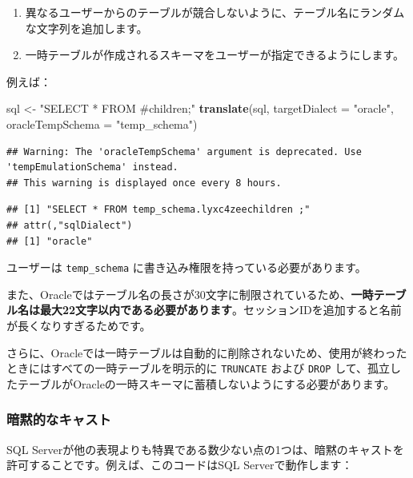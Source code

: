 \documentclass[
  11pt]{book}
\newenvironment{Shaded}{\begin{snugshade}}{\end{snugshade}}
\newcommand{\AttributeTok}[1]{\textcolor[rgb]{0.13,0.29,0.53}{#1}}
\newcommand{\FunctionTok}[1]{\textcolor[rgb]{0.13,0.29,0.53}{\textbf{#1}}}
\newcommand{\NormalTok}[1]{#1}
\newcommand{\OtherTok}[1]{\textcolor[rgb]{0.56,0.35,0.01}{#1}}
\newcommand{\StringTok}[1]{\textcolor[rgb]{0.31,0.60,0.02}{#1}}
\providecommand{\tightlist}{%
  \setlength{\itemsep}{0pt}\setlength{\parskip}{0pt}}
\theoremstyle{definition}
\theoremstyle{definition}
\theoremstyle{definition}
\theoremstyle{definition}
\theoremstyle{remark}
\begin{document}
\begin{enumerate}
\def\labelenumi{\arabic{enumi}.}
\tightlist
\item
  異なるユーザーからのテーブルが競合しないように、テーブル名にランダムな文字列を追加します。
\item
  一時テーブルが作成されるスキーマをユーザーが指定できるようにします。
\end{enumerate}

例えば：

\begin{Shaded}
\begin{Highlighting}[]
\NormalTok{sql }\OtherTok{\textless{}{-}} \StringTok{"SELECT * FROM \#children;"}
\FunctionTok{translate}\NormalTok{(sql, }\AttributeTok{targetDialect =} \StringTok{"oracle"}\NormalTok{, }\AttributeTok{oracleTempSchema =} \StringTok{"temp\_schema"}\NormalTok{)}
\end{Highlighting}
\end{Shaded}

\begin{verbatim}
## Warning: The 'oracleTempSchema' argument is deprecated. Use 'tempEmulationSchema' instead.
## This warning is displayed once every 8 hours.
\end{verbatim}

\begin{verbatim}
## [1] "SELECT * FROM temp_schema.lyxc4zeechildren ;"
## attr(,"sqlDialect")
## [1] "oracle"
\end{verbatim}

ユーザーは \texttt{temp\_schema} に書き込み権限を持っている必要があります。

また、Oracleではテーブル名の長さが30文字に制限されているため、\textbf{一時テーブル名は最大22文字以内である必要があります}。セッションIDを追加すると名前が長くなりすぎるためです。

さらに、Oracleでは一時テーブルは自動的に削除されないため、使用が終わったときにはすべての一時テーブルを明示的に \texttt{TRUNCATE} および \texttt{DROP} して、孤立したテーブルがOracleの一時スキーマに蓄積しないようにする必要があります。

\subsubsection*{暗黙的なキャスト}\label{ux6697ux9ed9ux7684ux306aux30adux30e3ux30b9ux30c8}

SQL Serverが他の表現よりも特異である数少ない点の1つは、暗黙のキャストを許可することです。例えば、このコードはSQL Serverで動作します：
\end{document}

